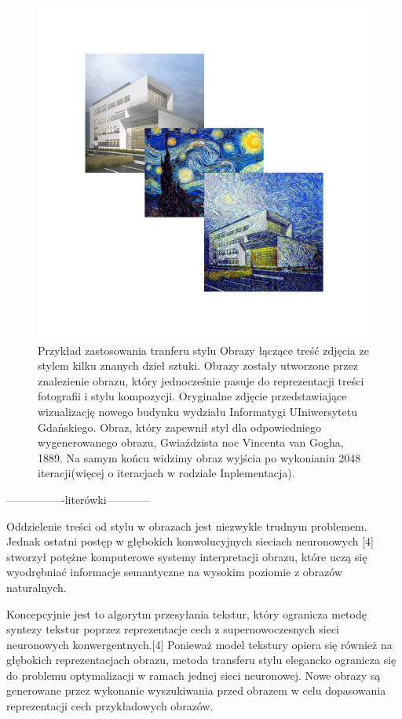 \documentclass[brudnopis]{xmgr}
\begin{document}
 \begin{figure}[!tbh]
\centering
\includegraphics[width=.8\hsize]{fig/6}
\caption{Przykład zastosowania tranferu stylu
Obrazy łączące treść zdjęcia ze stylem kilku znanych dzieł sztuki. Obrazy zostały utworzone przez znalezienie obrazu, który jednocześnie pasuje do reprezentacji treści fotografii i stylu kompozycji. Oryginalne zdjęcie przedstawiające wizualizację nowego budynku wydziału Informatygi UIniwersytetu Gdańskiego. Obraz, który zapewnił styl dla odpowiedniego wygenerowanego obrazu, Gwiaździsta noc Vincenta van Gogha, 1889. Na samym końcu widzimy obraz wyjścia po wykonianiu 2048 iteracji(więcej o iteracjach w rodziale Inplementacja).
\label{RYS.6}}
\end{figure}

----------------literówki------------

Oddzielenie treści od stylu w  obrazach jest niezwykle trudnym problemem. Jednak ostatni postęp w głębokich konwolucyjnych sieciach neuronowych [4] stworzył potężne komputerowe systemy interpretacji obrazu, które uczą się wyodrębniać informacje semantyczne na wysokim poziomie z obrazów naturalnych.

Koncepcyjnie jest to algorytm przesyłania tekstur, który ogranicza metodę syntezy tekstur poprzez reprezentacje cech z supernowoczesnych sieci neuronowych konwergentnych.[4] Ponieważ model tekstury opiera się również na głębokich reprezentacjach obrazu, metoda transferu stylu elegancko ogranicza się do problemu optymalizacji w ramach jednej sieci neuronowej. Nowe obrazy są generowane przez wykonanie wyszukiwania przed obrazem w celu dopasowania reprezentacji cech przykładowych obrazów.
\end{document}
